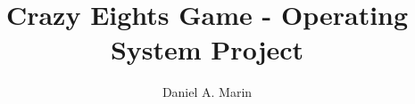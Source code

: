 \documentclass[conference]{IEEEtran}
\begin{document}
\title{Crazy Eights Game - Operating System Project}
\author{Daniel A. Marin}
\maketitle 
\end{document}
